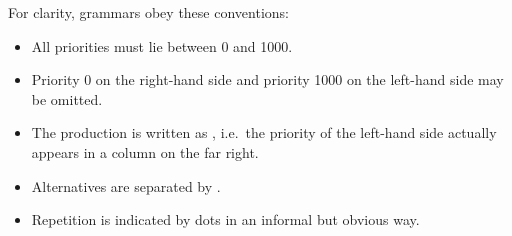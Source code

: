 \begin{isabellebody}
\begin{isamarkuptext}
  \medskip For clarity, grammars obey these conventions:
  \begin{itemize}

  \item All priorities must lie between 0 and 1000.

  \item Priority 0 on the right-hand side and priority 1000 on the
  left-hand side may be omitted.

  \item The production  is written as , i.e.\ the priority of the left-hand side actually appears in
  a column on the far right.

  \item Alternatives are separated by \isa{{\isachardoublequote}{\isacharbar}{\isachardoublequote}}.

  \item Repetition is indicated by dots \isa{{\isachardoublequote}{\isacharparenleft}{\isasymdots}{\isacharparenright}{\isachardoublequote}} in an informal
  but obvious way.

  \end{itemize}


\end{isamarkuptext}
\end{isabellebody}

